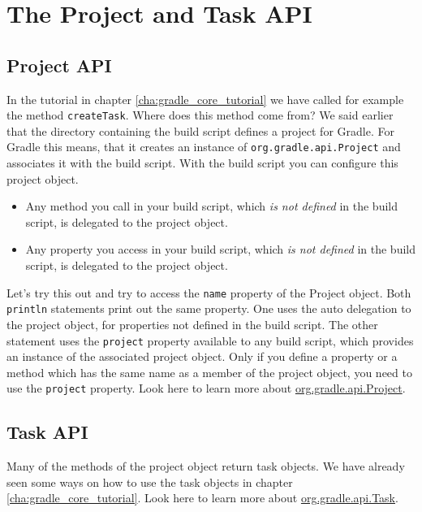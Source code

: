 \chapter{The Project and Task API} %
\label{cha:the_project_and_task_api}

\section{Project API} %
\label{sec:project_api}
In the tutorial in chapter \ref{cha:gradle_core_tutorial} we have called for example the method \texttt{createTask}. Where does this method come from? We said earlier that the directory containing the build script defines a project for Gradle. For Gradle this means, that it creates an instance of \texttt{org.gradle.api.Project} and associates it with the build script. With the build script you can configure this project object.
\begin{itemize}
	\item Any method you call in your build script, which \emph{is not defined} in the build script, is delegated to the project object.
	\item Any property you access in your build script, which \emph{is not defined} in the build script, is delegated to the project object.
\end{itemize}
Let's try this out and try to access the \texttt{name} property of the Project object.
Both \texttt{println} statements print out the same property. One uses the auto delegation to the project object, for properties not defined in the build script. The other statement uses the \texttt{project} property available to any build script, which provides an instance of the associated project object. Only if you define a property or a method which has the same name as a member of the project object, you need to use the \texttt{project} property. Look here to learn more about \href{\API Project.html}{org.gradle.api.Project}.
\section{Task API} %
\label{sec:task_api}
Many of the methods of the project object return task objects. We have already seen some ways on how to use the task objects in chapter \ref{cha:gradle_core_tutorial}. Look here to learn more about \href{\API Task.html}{org.gradle.api.Task}.
